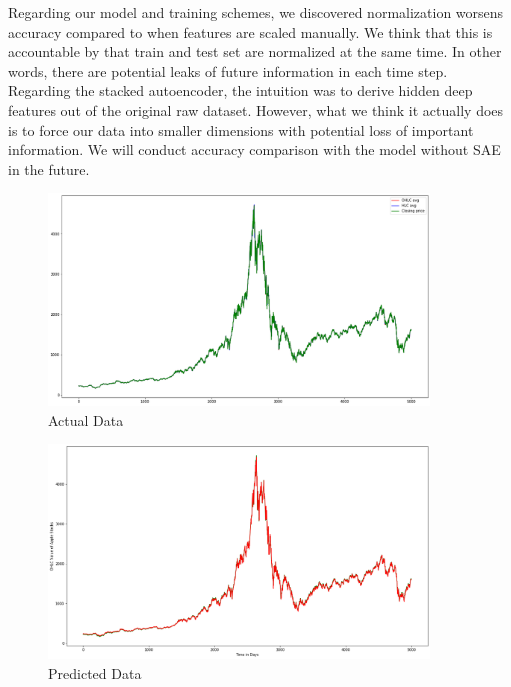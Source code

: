 Regarding our model and training schemes, we discovered normalization worsens accuracy compared to when features are scaled manually. We think that this is accountable by that train and test set are normalized at the same time. In other words, there are potential leaks of future information in each time step. Regarding the stacked autoencoder, the intuition was to derive hidden deep features out of the original raw dataset. However, what we think it actually does is to force our data into smaller dimensions with potential loss of important information. We will conduct accuracy comparison with the model without SAE in the future. 

\begin{figure}[htpb]
\begin{center}
\includegraphics[width=0.9\textwidth]{./figs/actualprice}
\vspace{-0.2cm}
\caption{Actual Data}
\label{fig_actual}
\end{center}
\vspace{-0.6cm}
\end{figure}

\begin{figure}[htpb]
\begin{center}
\includegraphics[width=0.9\textwidth]{./figs/predictedprice}
\vspace{-0.2cm}
\caption{Predicted Data}
\label{fig_predict}
\end{center}
\vspace{-0.6cm}
\end{figure}



